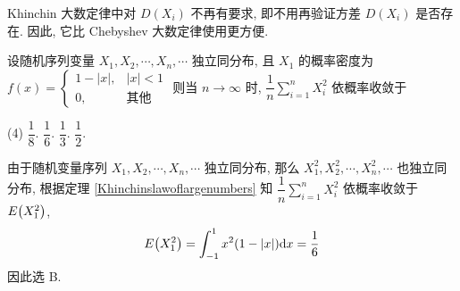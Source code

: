 Khinchin 大数定律中对 $ D\left(X_{i}\right) $ 不再有要求, 即不用再验证方差 $ D\left(X_{i}\right) $ 是否存在.
因此, 它比 Chebyshev 大数定律使用更方便.

\begin{example}
    设随机序列变量 $X_1, X_2, \cdots ,X_n, \cdots $ 独立同分布, 且 $X_1$ 的概率密度为 $f(x)=\begin{cases}
            1-|x|, & |x|<1 \\ 0,&\text{其他}
        \end{cases}$ 则当 $n\to \infty$ 时, $\displaystyle \dfrac{1}{n}\sum_{i=1}^{n} X_i^2$ 依概率收敛于
    \begin{tasks}(4)
        \task $\dfrac{1}{8}$.
        \task $\dfrac{1}{6}$.
        \task $\dfrac{1}{3}$.
        \task $\dfrac{1}{2}$.
    \end{tasks}
\end{example}
\begin{solution}
    由于随机变量序列  $X_1, X_2, \cdots ,X_n, \cdots $ 独立同分布, 那么  $X_1^2, X_2^2, \cdots ,X_n^2, \cdots $ 也独立同分布,
    根据定理 \ref{Khinchinslawoflargenumbers} 知 $\displaystyle \dfrac{1}{n}\sum_{i=1}^{n} X_i^2$ 依概率收敛于 $E\qty(X_1^2)$,
    $$
        E\qty(X_1^2)=\int_{-1}^{1} x^2(1-|x|) \dd x=\dfrac{1}{6}
    $$
    因此选 B.
\end{solution}